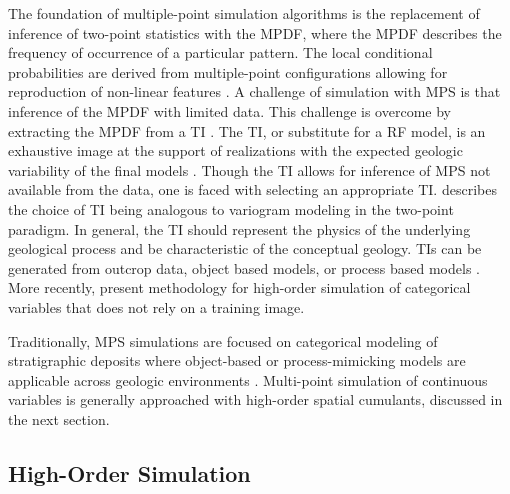 The foundation of multiple-point simulation algorithms \citep{guardiano1993multivariate,strebelle2002conditional} is the replacement of inference of two-point statistics with the \gls{MPDF}, where the \gls{MPDF} describes the frequency of occurrence of a particular pattern. The local conditional probabilities are derived from multiple-point configurations allowing for reproduction of non-linear features \citep{silva2014guide}. A challenge of simulation with \gls{MPS} is that inference of the \gls{MPDF} with limited data. This challenge is overcome by extracting the \gls{MPDF} from a \gls{TI} \citep{journel2005covariance}. The \gls{TI}, or substitute for a \gls{RF} model, is an exhaustive image at the support of realizations with the expected geologic variability of the final models \citep{gomez-hernandez2021one}. Though the \gls{TI} allows for inference of \gls{MPS} not available from the data, one is faced with selecting an appropriate \gls{TI}. \cite{boisvert2007multiplepoint} describes the choice of \gls{TI} being analogous to variogram modeling in the two-point paradigm. In general, the TI should represent the physics of the underlying geological process and be characteristic of the conceptual geology. \Glspl{TI} can be generated from outcrop data, object based models, or process based models \cite{tahmasebi2018multiple}. More recently, \cite{minniakhmetov2022highorder} present methodology for high-order simulation of categorical variables that does not rely on a training image.

Traditionally, \gls{MPS} simulations are focused on categorical modeling of stratigraphic deposits where object-based or process-mimicking models are applicable across geologic environments \citep{mariethoz2014multiplepoint}. Multi-point simulation of continuous variables is generally approached with high-order spatial cumulants, discussed in the next section.


\FloatBarrier
\subsection{High-Order Simulation}
\label{subsec:03hosim}

